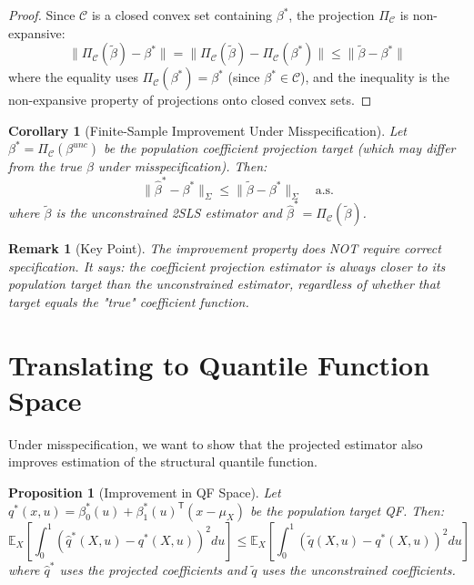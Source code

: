 \documentclass[11pt]{article}
\newcommand{\E}{\mathbb{E}}
\newcommand{\calC}{\mathcal{C}}
\newcommand{\T}{\mathsf{T}}
\newtheorem{proposition}{Proposition}
\newtheorem{corollary}{Corollary}
\newtheorem{remark}{Remark}
\begin{document}
\begin{proof}
Since $\calC$ is a closed convex set containing $\beta^*$, the projection $\Pi_\calC$ is non-expansive:
\[
\|\Pi_\calC(\tilde{\beta}) - \beta^*\| = \|\Pi_\calC(\tilde{\beta}) - \Pi_\calC(\beta^*)\| \leq \|\tilde{\beta} - \beta^*\|
\]
where the equality uses $\Pi_\calC(\beta^*) = \beta^*$ (since $\beta^* \in \calC$), and the inequality is the non-expansive property of projections onto closed convex sets.
\end{proof}

\begin{corollary}[Finite-Sample Improvement Under Misspecification]
Let $\beta^* = \Pi_\calC(\beta^{unc})$ be the population coefficient projection target (which may differ from the true $\beta$ under misspecification). Then:
\[
\|\hat{\beta}^* - \beta^*\|_{\Sigma} \leq \|\tilde{\beta} - \beta^*\|_{\Sigma} \quad \text{a.s.}
\]
where $\tilde{\beta}$ is the unconstrained 2SLS estimator and $\hat{\beta}^* = \Pi_\calC(\tilde{\beta})$.
\end{corollary}

\begin{remark}[Key Point]
The improvement property does NOT require correct specification. It says: the coefficient projection estimator is always closer to its population target than the unconstrained estimator, regardless of whether that target equals the "true" coefficient function.
\end{remark}

\section{Translating to Quantile Function Space}

Under misspecification, we want to show that the projected estimator also improves estimation of the structural quantile function.

\begin{proposition}[Improvement in QF Space]
Let $q^*(x, u) = \beta_0^*(u) + \beta_1^*(u)^\T(x - \mu_X)$ be the population target QF. Then:
\[
\E_X\left[ \int_0^1 (\hat{q}^*(X, u) - q^*(X, u))^2 du \right] \leq \E_X\left[ \int_0^1 (\tilde{q}(X, u) - q^*(X, u))^2 du \right]
\]
where $\hat{q}^*$ uses the projected coefficients and $\tilde{q}$ uses the unconstrained coefficients.
\end{proposition}
\end{document}
